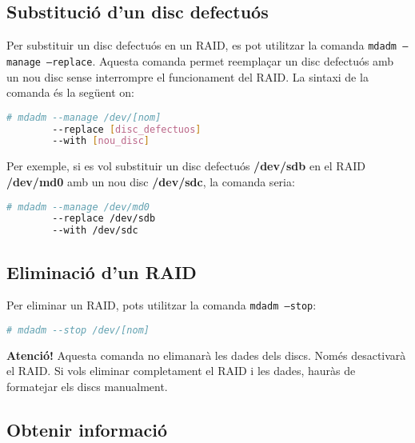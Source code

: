 \subsection{Substitució d'un disc defectuós}\label{substitució-dun-disc-defectuós}

Per substituir un disc defectuós en un RAID, es pot utilitzar la comanda \texttt{mdadm --manage --replace}. Aquesta comanda permet reemplaçar un disc defectuós amb un nou disc sense interrompre el funcionament del RAID. La sintaxi de la comanda és la següent on:

\begin{lstlisting}[language=bash, numbers=none, commentstyle=\color{black}]
# mdadm --manage /dev/[nom] 
        --replace [disc_defectuos] 
        --with [nou_disc]
\end{lstlisting}

Per exemple, si es vol substituir un disc defectuós \textbf{/dev/sdb} en el RAID \textbf{/dev/md0} amb un nou disc \textbf{/dev/sdc}, la comanda seria:

\begin{lstlisting}[language=bash, numbers=none, commentstyle=\color{black}]
# mdadm --manage /dev/md0 
        --replace /dev/sdb 
        --with /dev/sdc
\end{lstlisting}

\subsection{Eliminació d'un RAID}\label{eliminació-dun-raid}

Per eliminar un RAID, pots utilitzar la comanda \texttt{mdadm --stop}:

\begin{lstlisting}[language=bash, numbers=none, commentstyle=\color{black}]
# mdadm --stop /dev/[nom] 
\end{lstlisting}

\begin{mdframed}[linewidth=2pt,linecolor=red]
\textbf{Atenció!}  Aquesta comanda no elimanarà les dades dels discs. Només desactivarà el RAID. Si vols eliminar completament el RAID i les dades, hauràs de formatejar els discs manualment. 
\end{mdframed}

\subsection{Obtenir informació}\label{obtenir-informació}

